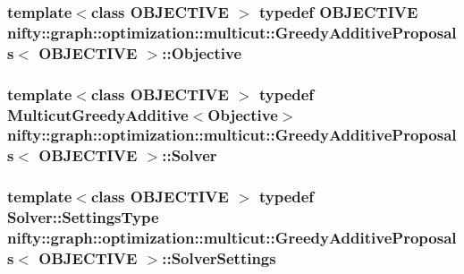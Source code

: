 \subsubsection[{Objective}]{\setlength{\rightskip}{0pt plus 5cm}template$<$class O\+B\+J\+E\+C\+T\+I\+V\+E $>$ typedef O\+B\+J\+E\+C\+T\+I\+V\+E {\bf nifty\+::graph\+::optimization\+::multicut\+::\+Greedy\+Additive\+Proposals}$<$ O\+B\+J\+E\+C\+T\+I\+V\+E $>$\+::{\bf Objective}}\label{classnifty_1_1graph_1_1optimization_1_1multicut_1_1GreedyAdditiveProposals_adfd52c9823ecb5022d236498f48fe847}
\hypertarget{classnifty_1_1graph_1_1optimization_1_1multicut_1_1GreedyAdditiveProposals_a36e416d890e71935f77dff5997d34b8a}{}
\subsubsection[{Solver}]{\setlength{\rightskip}{0pt plus 5cm}template$<$class O\+B\+J\+E\+C\+T\+I\+V\+E $>$ typedef {\bf Multicut\+Greedy\+Additive}$<${\bf Objective}$>$ {\bf nifty\+::graph\+::optimization\+::multicut\+::\+Greedy\+Additive\+Proposals}$<$ O\+B\+J\+E\+C\+T\+I\+V\+E $>$\+::{\bf Solver}}\label{classnifty_1_1graph_1_1optimization_1_1multicut_1_1GreedyAdditiveProposals_a36e416d890e71935f77dff5997d34b8a}
\hypertarget{classnifty_1_1graph_1_1optimization_1_1multicut_1_1GreedyAdditiveProposals_ab55ac4f3aa7045f18a03611695b40c96}{}
\subsubsection[{Solver\+Settings}]{\setlength{\rightskip}{0pt plus 5cm}template$<$class O\+B\+J\+E\+C\+T\+I\+V\+E $>$ typedef {\bf Solver\+::\+Settings\+Type} {\bf nifty\+::graph\+::optimization\+::multicut\+::\+Greedy\+Additive\+Proposals}$<$ O\+B\+J\+E\+C\+T\+I\+V\+E $>$\+::{\bf Solver\+Settings}}\label{classnifty_1_1graph_1_1optimization_1_1multicut_1_1GreedyAdditiveProposals_ab55ac4f3aa7045f18a03611695b40c96}


